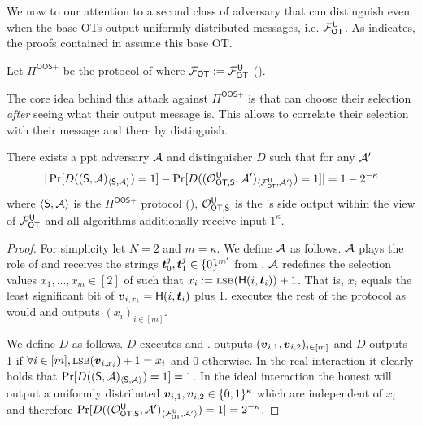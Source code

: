 We now to our attention to a second class of adversary that can distinguish even when the base OTs output uniformly distributed messages, i.e. $\OOT^\U$. As  indicates, the proofs contained in \cite{RSA:OrrOrsSch17} assume this base OT.

\begin{definition}\label{def:OOS2}
	Let $\Pi^{\textsf{OOS+}}$ be the protocol of  where $\OOT:=\OOT^\U$ ().
\end{definition}


The core idea behind this attack against $\Pi^{\textsf{OOS+}}$ is that \rec can choose their selection \emph{after} seeing what their output message is. This allows \rec to correlate their selection with their message and there by distinguish.

\begin{lemma} \label{lem:malRec2}
	There exists a ppt adversary $\Adv$ and distinguisher $D$ such that for any $\Adv'$ 
	$$
	|\Pr[D((\send, \Adv)_{\langle\send, \Adv\rangle})=1]-\Pr[D((\O^{\U}_{\textsf{OT,\send}}, \Adv')_{\langle\OOT^\U, \Adv'\rangle})=1]|=1-2^{-\kappa}
	$$
	where $\langle\send, \Adv\rangle$ is the $\Pi^{\textsf{OOS+}}$ protocol (), $\O^{\U}_{\textsf{OT,\send}}$ is the \send's side output within the view of $\OOT^{\U}$ and all algorithms additionally receive input $1^\kappa$. 
\end{lemma}
\begin{proof}
	For simplicity let $N=2$ and $m=\kappa$. We define $\Adv$ as follows. $\Adv$ plays the role of \rec and receives the strings $\tt_0^j,\tt_1^j\in \{0\}^{m'}$ from \OOT. $\Adv$ redefines the selection values $x_1,...,x_m\in[2]$ of \rec such that $x_i:=\textsc{lsb}(\H(i, \tt_i))+1$. That is, $x_i$ equals the least significant bit of $\vv_{i,x_i}=\H(i, \tt_i)$ plus 1. \Adv executes the rest of the protocol as \rec would and outputs $(x_i)_{i\in [m]}$.
	
	We define $D$ as follows. $D$ executes \send and \Adv. \send outputs $(\vv_{i,1},\vv_{i,2})_{i\in[m]}$ and $D$ outputs 1 if $\forall i\in[m], \textsc{lsb}(\vv_{i,x_i})+1=x_i$ and 0 otherwise. In the real interaction it clearly holds that $\Pr[D((\send, \Adv)_{\langle\send, \Adv\rangle})=1]=1$. In the ideal interaction the honest \send will output a uniformly distributed $\vv_{i,1},\vv_{i,2}\in\{0,1\}^\kappa$ which are independent of $x_i$ and therefore $\Pr[D((\O^{\U}_{\textsf{OT,\send}}, \Adv')_{\langle\OOT^\U, \Adv'\rangle})=1]=2^{-\kappa}$.
\end{proof}



